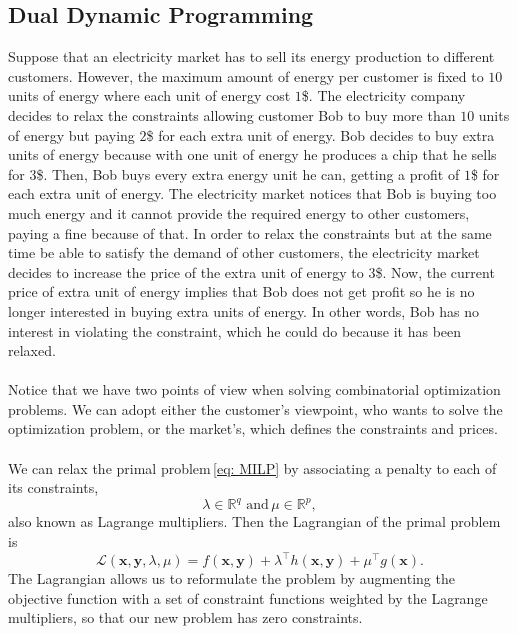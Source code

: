 \subsection{Dual Dynamic Programming}
Suppose that an electricity market has to sell its energy production to different customers. However, the maximum amount of energy per customer is fixed to $10$ units of energy where each unit of energy cost $1$\$. The electricity company decides to relax the constraints allowing customer Bob to buy more than $10$ units of energy but paying $2$\$ for each extra unit of energy. Bob decides to buy extra units of energy because with one unit of energy he produces a chip that he sells for $3$\$. Then, Bob buys every extra energy unit he can, getting a profit of $1$\$ for each extra unit of energy. The electricity market notices that Bob is buying too much energy and it cannot provide the required energy to other customers, paying a fine because of that. In order to relax the constraints but at the same time be able to satisfy the demand of other customers, the electricity market decides to increase the price of the extra unit of energy to $3$\$. Now, the current price of extra unit of energy implies that Bob does not get profit so he is no longer interested in buying extra units of energy. In other words, Bob has no interest in violating the constraint, which he could do because it has been relaxed.\\\\
Notice that we have two points of view when solving combinatorial optimization problems. We can adopt either the customer's viewpoint, who wants to solve the optimization problem, or the market's, which defines the constraints and prices.\\\\
We can relax the primal problem\,\eqref{eq: MILP} by associating a penalty to each of its constraints,
\begin{equation}
    \lambda\in\mathbb{R}^{q}\,\, \textrm{and} \, \mu\in\mathbb{R}^{p},
\end{equation}
also known as Lagrange multipliers. Then the Lagrangian of the primal problem is
\begin{equation}
    \mathcal{L}(\mathbf{x},\mathbf{y}, \lambda, \mu) = f(\mathbf{x}, \mathbf{y}) + \lambda^{\intercal}h(\mathbf{x},\mathbf{y}) + \mu^{\intercal}g(\mathbf{x}).
\end{equation}
The Lagrangian allows us to reformulate the problem by augmenting the objective function with a set of constraint functions weighted by the Lagrange multipliers, so that our new problem has zero constraints.
